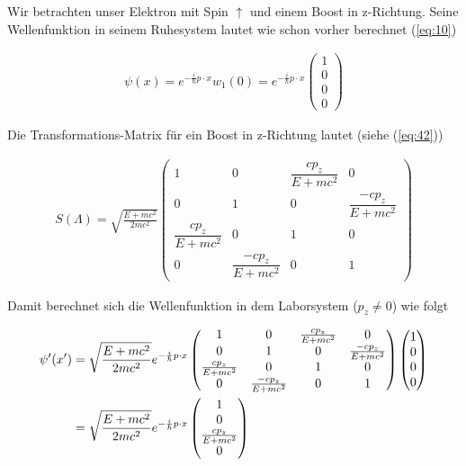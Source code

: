 Wir betrachten unser Elektron mit Spin \(\uparrow\) und einem Boost in z-Richtung. Seine Wellenfunktion in seinem Ruhesystem lautet wie schon vorher berechnet (\ref{eq:10})

\begin{align}
  \label{eq:44}
    \psi(x) = e^{-\frac{i}{\hbar}p\cdot x }w_1(0) = e^{-\frac{i}{\hbar}p\cdot x  }
    \begin{pmatrix}
      1\\0\\0\\0
    \end{pmatrix}
\end{align}

 Die Transformations-Matrix für ein Boost in z-Richtung lautet (siehe (\ref{eq:42}))

 \begin{align}
   \label{eq:45}
    S(\Lambda)=\sqrt{\frac{E + mc^2}{2mc^2}}
  \begin{pmatrix}
    1&0&\dfrac{cp_z}{E+mc^2}&0\\
    0&1&0&\dfrac{-cp_z}{E+mc^2}\\
    \dfrac{cp_z}{E+mc^2}&0&1&0\\
    0&\dfrac{-cp_z}{E+mc^2}&0&1
  \end{pmatrix}
 \end{align}

Damit berechnet sich die Wellenfunktion in dem Laborsystem (\(p_z\ne 0\)) wie folgt

\begin{align}
  \label{eq:46}
  \psi'(x') &=\sqrt{\frac{E + mc^2}{2mc^2}}e^{-\frac{i}{\hbar}p\cdot x  }
  \begin{pmatrix}
    1&0&\frac{cp_z}{E+mc^2}&0\\
    0&1&0&\frac{-cp_z}{E+mc^2}\\
    \frac{cp_z}{E+mc^2}&0&1&0\\
    0&\frac{-cp_z}{E+mc^2}&0&1
  \end{pmatrix}
    \begin{pmatrix}
      1\\0\\0\\0
    \end{pmatrix}\notag\\
&=\sqrt{\frac{E + mc^2}{2mc^2}}e^{-\frac{i}{\hbar}p\cdot x  }
   \begin{pmatrix}
      1\\0\\\frac{cp_z}{E+mc^2}\\0
    \end{pmatrix}
\end{align}

